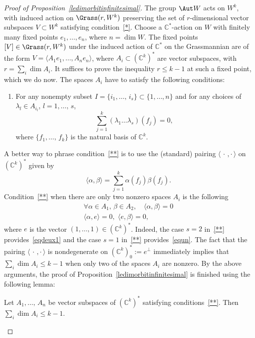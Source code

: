 \begin{proof}[Proof of Proposition~\ref{ledimorbitinfinitesimal}]
The group $\Aut W$ acts on $W^k$, with induced action on $\Grass(r,W^k)$ preserving the set of $r$-dimensional vector subspaces $V\subset W^k$ satisfying condition~\eqref{*}. Choose a $\mathbb{C}^*$-action on ${W}$ with finitely many fixed points $e_1,\dots, e_n$, where $n=\dim W$. The fixed points $[V]\in \Grass(r,W^k)$ under the induced action of $\mathbb{C}^*$ on the Grassmannian are of the form $V=\langle A_1e_1,\dots, A_n e_n\rangle$, where $A_i\subset (\mathbb{C}^k)^*$ are vector subspaces, with $r=\sum_i\dim A_i$. It suffices to prove the inequality $r\leq k-1$ at such a fixed point, which we do now. The spaces $A_i$ have to satisfy the following conditions:
\begin{enumerate}
\renewcommand{\theenumi}{$\ast\ast$}
\item \label{**}
For any nonempty subset $I=\{i_1,\dots,\,i_s\}\subset \{1,\dots,n\}$ and for any choices of $\lambda_l\in A_{i_l}$, $l=1,\dots,\,s$,
\[
\sum_{j=1}^k(\lambda_1\dots\lambda_s)(f_j)=0,
\]
where $\{f_1,\dots, \,f_k\}$ is the natural basis of $\mathbb{C}^k$.
\end{enumerate}

A better way to phrase condition~\eqref{**} is to use the (standard) pairing $\langle\,\cdot\,,\cdot\,\rangle$ on $(\mathbb{C}^k)^*$ given by
\[
\langle \alpha,\beta\rangle=\sum_{j=1}^k\alpha(f_j)\beta(f_j).
\]
Condition~\eqref{**} when there are only two nonzero spaces $A_i$ is the following
\begin{align}\label{eqdeux1}
\forall \alpha\in A_1,\,\beta\in A_2,\,\,\,\,\,\, \langle\alpha,\beta\rangle=0\\\label{equn}
\langle \alpha,e\rangle=0,\,\,\langle e,\beta\rangle=0,
\end{align}
where $e$ is the vector $(1,\dots,1)\in (\mathbb{C}^k)^*$. Indeed, the case $s=2$ in~\eqref{**} provides~\eqref{eqdeux1} and the case $s=1$ in~\eqref{**} provides~\eqref{equn}. The fact that the pairing $\langle\,\cdot\,,\cdot\,\rangle$ is nondegenerate on $(\mathbb{C}^k)^*_0:=e^{\perp}$ immediately implies that $\sum_i\dim A_i\leq k-1$ when only two of the spaces $A_i$ are nonzero. By the above arguments, the proof of Proposition~\ref{ledimorbitinfinitesimal} is finished using the following lemma:

\begin{lemm}\label{lepourproduitdeformes}
Let $A_1,\dots,\,A_n$ be vector subspaces of
$(\mathbb{C}^k)^*$ satisfying conditions~\eqref{**}. Then $\sum_i\dim A_i\leq k-1$.
\end{lemm}


\end{proof}
